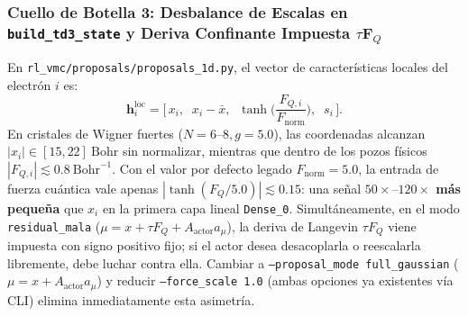 \documentclass[10pt,a4paper]{article}
\begin{document}
\subsubsection*{Cuello de Botella 3: Desbalance de Escalas en \texttt{build\_td3\_state} y Deriva Confinante Impuesta $\tau \bm{F}_Q$}
En \texttt{rl\_vmc/proposals/proposals\_1d.py}, el vector de características locales del electrón $i$ es:
\begin{equation}
\bm{h}_i^{\mathrm{loc}} = \Big[\, x_i,\;\; x_i - \bar{x},\;\; \tanh\!\Big(\frac{F_{Q,i}}{F_{\mathrm{norm}}}\Big),\;\; s_i \,\Big].
\end{equation}
En cristales de Wigner fuertes ($N=6\text{--}8, g=5.0$), las coordenadas alcanzan $|x_i| \in [15, 22]\ \mathrm{Bohr}$ sin normalizar, mientras que dentro de los pozos físicos $|F_{Q,i}| \lesssim 0.8\ \mathrm{Bohr}^{-1}$. Con el valor por defecto legado $F_{\mathrm{norm}} = 5.0$, la entrada de fuerza cuántica vale apenas $|\tanh(F_Q/5.0)| \lesssim 0.15$: una señal \textbf{$50\times\text{--}120\times$ más pequeña} que $x_i$ en la primera capa lineal \texttt{Dense\_0}. Simultáneamente, en el modo \texttt{residual\_mala} ($\mu = x + \tau F_Q + A_{\mathrm{actor}} a_\mu$), la deriva de Langevin $\tau F_Q$ viene impuesta con signo positivo fijo; si el actor desea desacoplarla o reescalarla libremente, debe luchar contra ella. Cambiar a \texttt{--proposal\_mode full\_gaussian} ($\mu = x + A_{\mathrm{actor}} a_\mu$) y reducir \texttt{--force\_scale 1.0} (ambas opciones ya existentes vía CLI) elimina inmediatamente esta asimetría.
\end{document}
